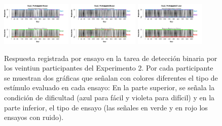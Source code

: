 \begin{figure}[th]
\includegraphics[width=0.30\textwidth]{Figures/BiasResp_Exp2_P19} \includegraphics[width=0.30\textwidth]{Figures/BiasResp_Exp2_P20} \includegraphics[width=0.30\textwidth]{Figures/BiasResp_Exp2_P21}
\caption[Respuesta binaria registrada ensayo a ensayo en relación con el tipo de estímulo a evaluar; Experimento 2]{Respuesta registrada por ensayo en la tarea de detección binaria por los veintiun participantes del Experimento 2. Por cada participante se muestran dos gráficas que señalan con colores diferentes el tipo de estímulo evaluado en cada ensayo: En la parte superior, se señala la condición de dificultad (azul para fácil y violeta para difícil) y en la parte inferior, el tipo de ensayo (las señales en verde y en rojo los ensayos con ruido).}
\label{fig:BiasResp_E2}
\end{figure}

